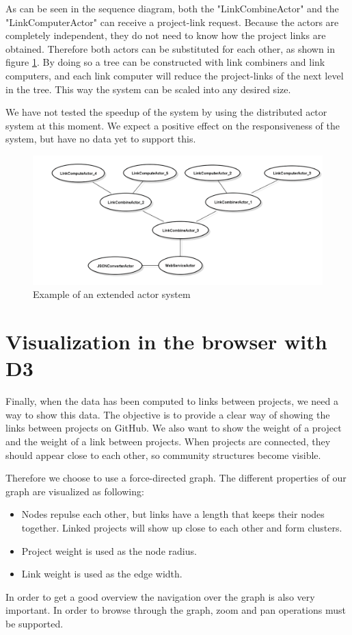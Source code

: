 \documentclass[10pt,a4paper]{article}
\begin{document}
As can be seen in the sequence diagram, both the "LinkCombineActor" and the "LinkComputerActor" can receive a project-link request. Because the actors are completely independent, they do not need to know how the project links are obtained. Therefore both actors can be substituted for each other, as shown in figure \ref{fig:example_scalable}. By doing so a tree can be constructed with link combiners and link computers, and each link computer will reduce the project-links of the next level in the tree. This way the system can be scaled into any desired size.

We have not tested the speedup of the system by using the distributed actor system at this moment. We expect a positive effect on the responsiveness of the system, but have no data yet to support this.

\begin{figure}[htb]
    \centering
    \includegraphics[width=1.00\textwidth]{ActorSystemSampleExtended}
    \caption{Example of an extended actor system}
    \label{fig:example_scalable}
\end{figure}

\section{Visualization in the browser with D3}\label{sec:visualization}

Finally, when the data has been computed to links between projects, we need a way to show this data. The objective is to provide a clear way of showing the links between projects on GitHub. We also want to show the weight of a project and the weight of a link between projects. When projects are connected, they should appear close to each other, so community structures become visible.

Therefore we choose to use a force-directed graph. The different properties of our graph are visualized as following:
\begin{itemize}
    \item Nodes repulse each other, but links have a length that keeps their nodes together. Linked projects will show up close to each other and form clusters.
    \item Project weight is used as the node radius.
    \item Link weight is used as the edge width.
\end{itemize}
In order to get a good overview the navigation over the graph is also very important. In order to browse through the graph, zoom and pan operations must be supported.
\end{document}
